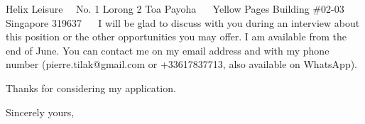 \documentclass{scrlttr2}
\renewcommand{\\}{\ {\large\textperiodcentered}\ }
\begin{document}
\begin{letter}{ %
Helix Leisure\\
No. 1 Lorong 2 Toa Payoha \\
Yellow Pages Building  \#02-03 \\
Singapore 319637 \\
}
I will be glad to discuss with you during an interview about this position or the other opportunities you may offer.
	I am available from the end of June. You can contact me on my email address and with my phone
	number (pierre.tilak@gmail.com or +33617837713, also available on WhatsApp).

Thanks for considering my application.

%
%
%
%
Sincerely yours, \\ \\ \\


\end{letter}
\end{document}
